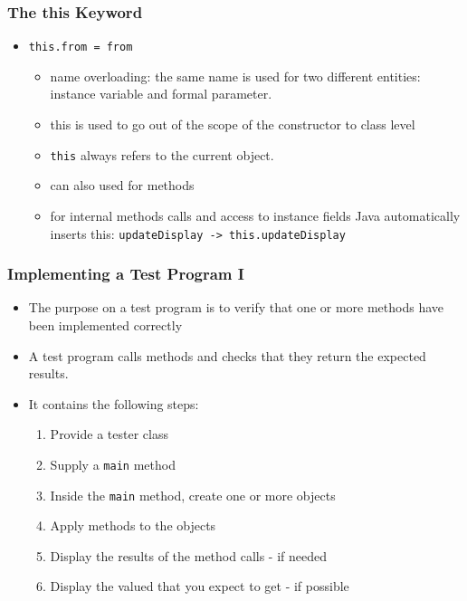 \documentclass{beamer}
\begin{document}
\begin{frame}[fragile]
\frametitle{The this Keyword}
\begin{itemize}
\item \lstinline!this.from = from!
\begin{itemize}
\item \alert{name overloading}: the same name is used for two different entities: instance variable and formal parameter.
\item this is used to go out of the scope of the constructor to class level
\item \alert{\lstinline!this!} always refers to the current object.
\item can also used for methods
\item for internal methods calls and access to instance fields Java automatically inserts this:
\lstinline!updateDisplay -> this.updateDisplay!
\end{itemize}
\end{itemize}
\end{frame}

\begin{frame}[fragile]
\frametitle{Implementing a Test Program I}
\begin{itemize}
\item The purpose on a test program is to verify that one or more methods have been implemented correctly
\item A test program calls methods and checks that they return the expected results. 
\item It contains the following steps:
\begin{enumerate}
\item Provide a tester class
\item Supply a \lstinline!main! method
\item Inside the \lstinline!main! method, create one or more objects
\item Apply methods to the objects
\item Display the results of the method calls - if needed
\item Display the valued that you expect to get - if possible
\end{enumerate}
\end{itemize}
\end{frame}
\end{document}
